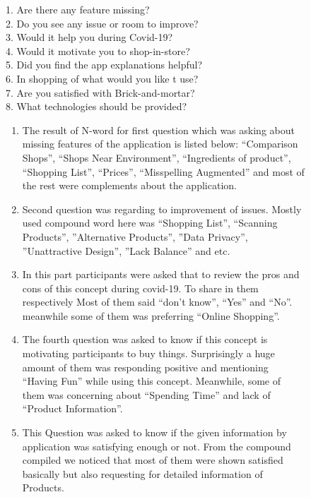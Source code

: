 \documentclass[letterpaper, 10 pt, conference]{ieeeconf}
\begin{document}
\begin{figure}
1. Are there any feature missing?\\
2. Do you see any issue or room to improve?\\
3. Would it help you during Covid-19?\\
4. Would it motivate you to shop-in-store?\\
5. Did you find the app explanations helpful?\\
6. In shopping of what would you like t use?\\
7. Are you satisfied with Brick-and-mortar?\\
8. What technologies should be provided?\\


\end{figure}
\begin{figure}[h!]
\begin{enumerate}
  \item The result of N-word for first question which was asking about missing features of the application is listed below: “Comparison Shops”, “Shops Near Environment”, “Ingredients of product”, “Shopping List”, “Prices”, “Misspelling Augmented” and most of the rest were complements about the application.\\
  \item Second question was regarding to improvement of issues. Mostly used compound word here was “Shopping List”, “Scanning Products”, ”Alternative Products”, ”Data Privacy”, ”Unattractive Design”, ”Lack Balance” and etc.\\
  \item In this part participants were asked that to review the pros and cons of this concept during covid-19. To share in them respectively Most of them said “don’t know”, “Yes” and “No”. meanwhile some of them was preferring “Online Shopping”.\\
  \item The fourth question was asked to know if this concept is motivating participants to buy things. Surprisingly a huge amount of them was responding positive and mentioning “Having Fun” while using this concept. Meanwhile, some of them was concerning about “Spending Time” and lack of “Product Information”.\\
  \item This Question was asked to know if the given information by application was satisfying enough or not. From the compound compiled we noticed that most of them were shown satisfied basically but also requesting for detailed information of Products.\\

\end{enumerate}
\end{figure}
\end{document}
